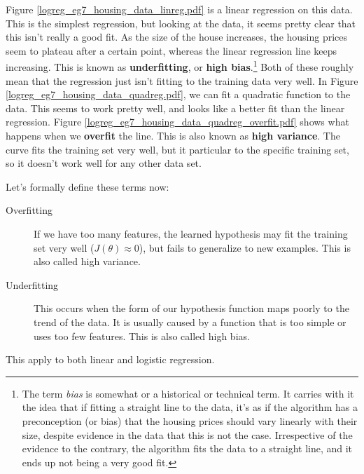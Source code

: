 Figure \ref{logreg_eg7_housing_data_linreg.pdf} is a linear regression on this data. This is the simplest regression, but looking at the data, it seems pretty clear that this isn't really a good fit. As the size of the house increases, the housing prices seem to plateau after a certain point, whereas the linear regression line keeps increasing. This is known as \textbf{underfitting}, or \textbf{high bias}.\footnote{The term \textit{bias} is somewhat or a historical or technical term. It carries with it the idea that if fitting a straight line to the data, it's as if the algorithm has a preconception (or bias) that the housing prices should vary linearly with their size, despite evidence in the data that this is not the case. Irrespective of the evidence to the contrary, the algorithm fits the data to a straight line, and it ends up not being a very good fit.} Both of these roughly mean that the regression just isn't fitting to the training data very well. In Figure \ref{logreg_eg7_housing_data_quadreg.pdf}, we can fit a quadratic function to the data. This seems to work pretty well, and looks like a better fit than the linear regression. Figure \ref{logreg_eg7_housing_data_quadreg_overfit.pdf} shows what happens when we \textbf{overfit} the line. This is also known as \textbf{high variance}. The curve fits the training set very well, but it particular to the specific training set, so it doesn't work well for any other data set. 

Let's formally define these terms now:
\begin{description}
\item[Overfitting] If we have too many features, the learned hypothesis may fit the training set very well ($J\left(\theta\right) \approx 0$), but fails to generalize to new examples. This is also called high variance. 
\item[Underfitting] This occurs when the form of our hypothesis function maps poorly to the trend of the data. It is usually caused by a function that is too simple or uses too few features. This is also called high bias. 
\end{description}
This apply to both linear and logistic regression. 

